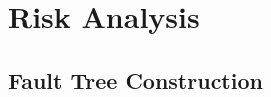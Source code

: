 \chapter{Risk Analysis}
\label{chapter:risk-analysis}

\section{Fault Tree Construction}
\label{sec:fault-tree}


